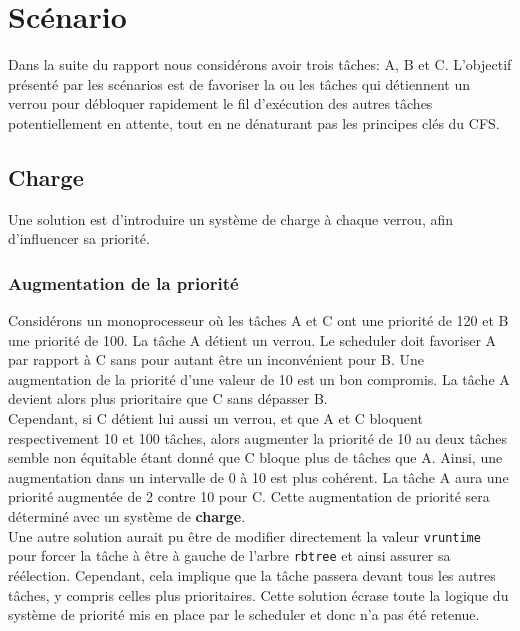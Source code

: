 \section{Scénario}

Dans la suite du rapport nous considérons avoir trois tâches: A, B et C. 
L'objectif présenté par les scénarios est de favoriser
la ou les tâches qui détiennent un verrou pour débloquer rapidement le fil d'exécution
des autres tâches potentiellement en attente, tout en ne dénaturant pas les principes
clés du CFS.


\subsection{Charge}

Une solution est d'introduire un système de charge à chaque verrou, afin
d'influencer sa priorité.

\subsubsection{Augmentation de la priorité}

Considérons un monoprocesseur où
les tâches A et C ont une priorité de 120 et B une priorité de 100.
La tâche A détient un verrou. Le scheduler doit favoriser A par rapport à C sans pour
autant être un inconvénient pour B.
Une augmentation de la priorité d'une valeur de 10 est un bon compromis. La tâche A
devient alors plus prioritaire que C sans dépasser B.
\\

Cependant, si C détient lui aussi un verrou, et que A et C bloquent respectivement 
10 et 100 tâches, alors augmenter la priorité de 10 au deux tâches semble non équitable
étant donné que C bloque plus de tâches que A. Ainsi, une augmentation dans un
intervalle de 0 à 10 est plus cohérent. La tâche A aura une priorité augmentée
de 2 contre 10 pour C. Cette augmentation de priorité sera déterminé
avec un système de \textbf{charge}.
\\

Une autre solution aurait pu être de modifier directement la valeur \verb|vruntime|
pour forcer la tâche à être à gauche de l'arbre \verb|rbtree| et ainsi assurer sa
réélection. Cependant, cela implique que la tâche passera devant tous les autres tâches,
y compris celles plus prioritaires. Cette solution écrase toute la logique du système
de priorité mis en place par le scheduler et donc n'a pas été retenue.


